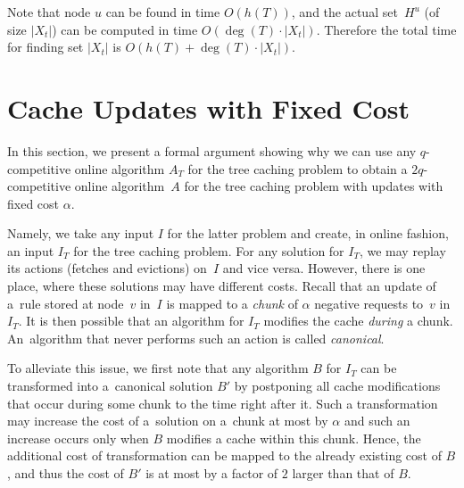Note that node $u$ can be found in time $O(h(T))$, and the 
actual set~$H^u$ (of size $|X_t|$) can be computed 
in time $O(\deg(T) \cdot |X_t|)$. Therefore the total time 
for finding set $|X_t|$ is $O(h(T) + \deg(T) \cdot |X_t|)$.


%



\section{Cache Updates with Fixed Cost}
\label{sec:bisimulation}


In this section, we present a formal argument showing why we can use any
$q$-competitive online algorithm $A_T$ for the tree caching problem to obtain
a $2 q$-competitive online algorithm~$A$ for the tree caching problem with updates with fixed cost $\alpha$.

Namely, we take any input $I$ for the latter problem and create, in online
fashion, an input $I_T$ for the tree caching problem.
For any solution for $I_T$, we may replay its actions (fetches and evictions)
on~$I$ and vice versa. However, there is one place, where these solutions 
may have different costs. Recall that an update of a~rule stored at node~$v$
in~$I$ is mapped to a \emph{chunk} of $\alpha$ negative requests to~$v$ 
in~$I_T$. It is then possible that an algorithm for $I_T$ modifies the cache
\emph{during} a chunk. An~algorithm that never performs such an action
is called \emph{canonical}.

To alleviate this issue, we first note that any algorithm $B$ for $I_T$ can be
transformed into a~canonical solution $B'$ by postponing all cache modifications
that occur during some chunk to the time right after it. Such a transformation
may increase the cost of a~solution on a~chunk at most by $\alpha$ and such an
increase occurs only when $B$ modifies a cache within this chunk. Hence, the
additional cost of transformation can be mapped to the already existing cost of
$B$, and thus the cost of $B'$ is at most by a factor of $2$ larger than that
of $B$.

